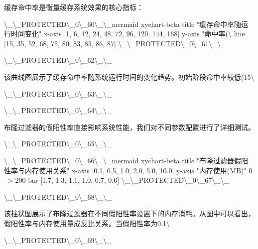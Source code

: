 缓存命中率是衡量缓存系统效果的核心指标：

\textbackslash{}_\textbackslash{}_PROTECTED\textbackslash{}_0\textbackslash{}_60\textbackslash{}_\textbackslash{}_mermaid
xychart-beta
    title "缓存命中率随运行时间变化"
    x-axis [1, 6, 12, 24, 48, 72, 96, 120, 144, 168]
    y-axis "命中率(\textbackslash{}%
    line [15, 35, 52, 68, 75, 80, 83, 85, 86, 87]
\textbackslash{}_\textbackslash{}_PROTECTED\textbackslash{}_0\textbackslash{}_61\textbackslash{}_\textbackslash{}_

\textbackslash{}_\textbackslash{}_PROTECTED\textbackslash{}_0\textbackslash{}_62\textbackslash{}_\textbackslash{}_

该曲线图展示了缓存命中率随系统运行时间的变化趋势。初始阶段命中率较低(15\textbackslash{}%

\textbackslash{}_\textbackslash{}_PROTECTED\textbackslash{}_0\textbackslash{}_63\textbackslash{}_\textbackslash{}_

\textbackslash{}_\textbackslash{}_PROTECTED\textbackslash{}_0\textbackslash{}_64\textbackslash{}_\textbackslash{}_

布隆过滤器的假阳性率直接影响系统性能，我们对不同参数配置进行了详细测试。

\textbackslash{}_\textbackslash{}_PROTECTED\textbackslash{}_0\textbackslash{}_65\textbackslash{}_\textbackslash{}_

\textbackslash{}_\textbackslash{}_PROTECTED\textbackslash{}_0\textbackslash{}_66\textbackslash{}_\textbackslash{}_mermaid
xychart-beta
    title "布隆过滤器假阳性率与内存使用关系"
    x-axis [0.1, 0.5, 1.0, 2.0, 5.0, 10.0]
    y-axis "内存使用(MB)" 0 --> 200
    bar [1.7, 1.3, 1.1, 1.0, 0.7, 0.6]
\textbackslash{}_\textbackslash{}_PROTECTED\textbackslash{}_0\textbackslash{}_67\textbackslash{}_\textbackslash{}_

\textbackslash{}_\textbackslash{}_PROTECTED\textbackslash{}_0\textbackslash{}_68\textbackslash{}_\textbackslash{}_

该柱状图展示了布隆过滤器在不同假阳性率设置下的内存消耗。从图中可以看出，假阳性率与内存使用量成反比关系。当假阳性率为0.1\textbackslash{}%

\textbackslash{}_\textbackslash{}_PROTECTED\textbackslash{}_0\textbackslash{}_69\textbackslash{}_\textbackslash{}_

